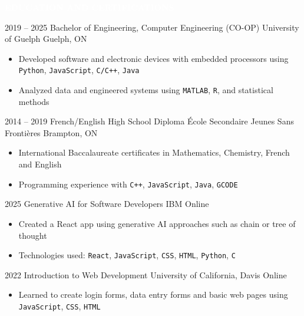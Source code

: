 \documentclass[9pt]{src/developercv} %
\begin{document}
	\colorbox{sky900}{\textcolor{white}{\LARGE\MakeUppercase{\textbf{Education and Certifications}}}}\\%
	\begin{entrylist}
		\atsentry
			{2019 -- 2025}
			{Bachelor of Engineering, Computer Engineering (CO-OP)}
			{University of Guelph}
			{Guelph, ON}
			{
				\vspace{-1.0\baselineskip}
				\begin{itemize}
					\item Developed software and electronic devices with embedded processors using \texttt{Python}, \texttt{JavaScript}, \texttt{C/C++}, \texttt{Java}
					\item Analyzed data and engineered systems using \texttt{MATLAB}, \texttt{R}, and statistical methods
				\end{itemize}
			}
		\atsentry
			{2014 -- 2019}
			{French/English High School Diploma}
			{École Secondaire Jeunes Sans Frontières}
			{Brampton, ON}
			{
				\vspace{-1.0\baselineskip}
				\begin{itemize}
					\item International Baccalaureate certificates in Mathematics, Chemistry, French and English
					\item Programming experience with \texttt{C++}, \texttt{JavaScript}, \texttt{Java}, \texttt{GCODE}
				\end{itemize}
			}
		\atsentry
			{2025}
			{Generative AI for Software Developers}
			{IBM}
			{Online}
			{
				\vspace{-1.0\baselineskip}
				\begin{itemize}
					\item Created a React app using generative AI approaches such as chain or tree of thought
					\item Technologies used: \texttt{React}, \texttt{JavaScript}, \texttt{CSS}, \texttt{HTML}, \texttt{Python}, \texttt{C}
				\end{itemize}
			}
		\atsentry
			{2022}
			{Introduction to Web Development}
			{University of California, Davis}
			{Online}
			{
				\vspace{-1.0\baselineskip}
				\begin{itemize}
					\item Learned to create login forms, data entry forms and basic web pages using \texttt{JavaScript}, \texttt{CSS}, \texttt{HTML}
				\end{itemize}
			}
	\end{entrylist}
\end{document}
